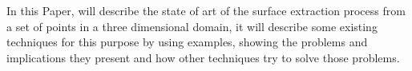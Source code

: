 %
In this Paper, will describe the state of art of the surface extraction process from a set of 
points in a three dimensional domain, it will describe some existing techniques for this purpose 
by using examples, showing the problems and implications they present and how other techniques 
try to solve those problems.